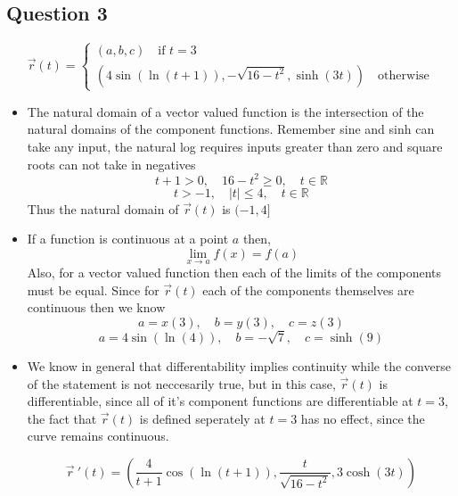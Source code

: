 \documentclass{article}
\begin{document}
\subsection*{Question 3}
\[
\vec{r}(t) = \begin{cases}
    (a,b,c) \quad \text{if } t = 3 \\
    (4\sin(\ln(t+1)), -\sqrt{16-t^2}, \sinh(3t)) \quad \text{otherwise}
\end{cases}
\]

\begin{itemize}
    \item The natural domain of a vector valued function is the intersection of the
    natural domains of the component functions. Remember sine and sinh can take any input, the
    natural log requires inputs greater than zero and square roots can not take in negatives
    \[
    t+1 > 0, \quad 16-t^2 \geq 0, \quad t \in \mathbb{R}
    \]
    \[
    t > -1, \quad |t| \leq 4, \quad t \in \mathbb{R}
    \]
    Thus the natural domain of \(\vec{r}(t)\) is \((-1, 4]\)   
    
    \item If a function is continuous at a point \(a\) then,
    \[
    \lim_{x\to a}{f(x)} = f(a)
    \]
    Also, for a vector valued function then each of the limits of the components must 
    be equal.
    Since for \(\vec{r}(t)\) each of the components themselves are continuous then we know
    \[
    a = x(3), \quad b = y(3), \quad c = z(3)
    \]
    \[
    a = 4 \sin(\ln(4)), \quad b = -\sqrt{7}, \quad c = \sinh(9)
    \]

    \item We know in general that differentability implies continuity while the converse of the statement is
    not neccesarily true,
    but in this case, \(\vec{r}(t)\) is differentiable, since all of it's component functions are
    differentiable at \(t = 3\), the fact that \(\vec{r}(t)\) is defined seperately at \(t=3\) has no effect, since the curve
    remains continuous.

    \[
    \vec{r} \ '(t) = \left(\frac{4}{t+1}\cos(\ln(t+1)), \frac{t}{\sqrt{16-t^2}}, 3\cosh(3t)\right) 
    \]
\end{itemize}
\end{document}
